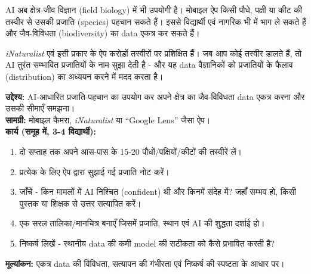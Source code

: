 AI अब क्षेत्र-जीव विज्ञान (field biology) में भी उपयोगी है। मोबाइल ऐप किसी पौधे, पक्षी
या कीट की तस्वीर से उसकी प्रजाति (species) पहचान सकते हैं। इससे विद्यार्थी एवं नागरिक
भी  में भाग ले सकते हैं और जैव-विविधता
(biodiversity) का data एकत्र कर सकते हैं।

\begin{jante}
\emph{iNaturalist} एवं इसी प्रकार के ऐप करोड़ों तस्वीरों पर प्रशिक्षित हैं। जब आप कोई
तस्वीर डालते हैं, तो AI तुरंत सम्भावित प्रजातियों के नाम सुझा देती है - और यह data
वैज्ञानिकों को प्रजातियों के फैलाव (distribution) का अध्ययन करने में मदद करता है।
\end{jante}

\begin{pariyojana}[स्थानीय जैव-विविधता का मानचित्र]
\textbf{उद्देश्य:} AI-आधारित प्रजाति-पहचान का उपयोग कर अपने क्षेत्र का जैव-विविधता
data एकत्र करना और उसकी सीमाएँ समझना।\\[4pt]
\textbf{सामग्री:} मोबाइल कैमरा, \emph{iNaturalist} या “Google Lens” जैसा ऐप।\\[4pt]
\textbf{कार्य (समूह में, 3-4 विद्यार्थी):}
\begin{enumerate}[leftmargin=1.6em]
  \item दो सप्ताह तक अपने आस-पास के 15-20 पौधों/पक्षियों/कीटों की तस्वीरें लें।
  \item प्रत्येक के लिए ऐप द्वारा सुझाई गई प्रजाति नोट करें।
  \item जाँचें - किन मामलों में AI निश्चित (confident) थी और किनमें संदेह में?
        जहाँ सम्भव हो, किसी पुस्तक या शिक्षक से उत्तर सत्यापित करें।
  \item एक सरल तालिका/मानचित्र बनाएँ जिसमें प्रजाति, स्थान एवं AI की शुद्धता दर्शाई हो।
  \item निष्कर्ष लिखें - स्थानीय data की कमी model की सटीकता को कैसे प्रभावित करती है?
\end{enumerate}
\textbf{मूल्यांकन:} एकत्र data की विविधता, सत्यापन की गंभीरता एवं निष्कर्ष की
स्पष्टता के आधार पर।
\end{pariyojana}

